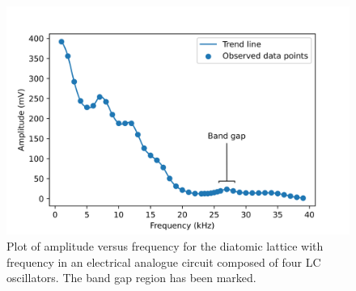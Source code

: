 \documentclass[%
 aip,
 amsmath,amssymb,
 reprint, floatfix%
]{revtex4-1}
\begin{document}
    \begin{figure}
        \centering
        \includegraphics[scale = 0.56]{Figures/plot-amplitude.png}
        \caption{Plot of amplitude versus frequency for the diatomic lattice with frequency in an electrical analogue circuit composed of four LC oscillators. The band gap region has been marked.}
        \label{fig:amplitude}
    \end{figure}
\end{document}

